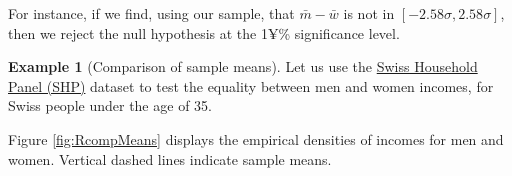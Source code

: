 \documentclass[
  12pt,
]{book}
\newenvironment{Shaded}{\begin{snugshade}}{\end{snugshade}}
\newcommand{\AttributeTok}[1]{\textcolor[rgb]{0.77,0.63,0.00}{#1}}
\newcommand{\CommentTok}[1]{\textcolor[rgb]{0.56,0.35,0.01}{\textit{#1}}}
\newcommand{\DecValTok}[1]{\textcolor[rgb]{0.00,0.00,0.81}{#1}}
\newcommand{\FunctionTok}[1]{\textcolor[rgb]{0.00,0.00,0.00}{#1}}
\newcommand{\NormalTok}[1]{#1}
\newcommand{\OtherTok}[1]{\textcolor[rgb]{0.56,0.35,0.01}{#1}}
\newcommand{\SpecialCharTok}[1]{\textcolor[rgb]{0.00,0.00,0.00}{#1}}
\newcommand{\StringTok}[1]{\textcolor[rgb]{0.31,0.60,0.02}{#1}}
\theoremstyle{definition}
\theoremstyle{definition}
\newtheorem{example}{Example}[chapter]
\theoremstyle{definition}
\theoremstyle{definition}
\theoremstyle{remark}
\begin{document}
For instance, if we find, using our sample, that \(\bar{m} - \bar{w}\) is not in \([-2.58\sigma,2.58\sigma]\), then we reject the null hypothesis at the 1¥\% significance level.

\begin{example}[Comparison of sample means]
\protect\hypertarget{exm:comparSmplMeans}{}\label{exm:comparSmplMeans}Let us use the \href{https://forscenter.ch/projects/swiss-household-panel/}{Swiss Household Panel (SHP)} dataset to test the equality between men and women incomes, for Swiss people under the age of 35.

Figure \ref{fig:RcompMeans} displays the empirical densities of incomes for men and women. Vertical dashed lines indicate sample means.

\begin{Shaded}
\end{Shaded}
\end{example}
\end{document}
